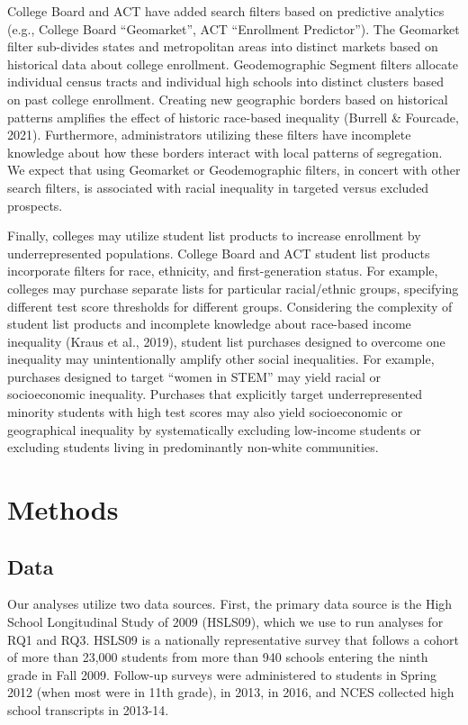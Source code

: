 \documentclass[
  12pt,
]{article}
\begin{document}
College Board and ACT have added search filters based on predictive analytics (e.g., College Board ``Geomarket'', ACT ``Enrollment Predictor''). The Geomarket filter sub-divides states and metropolitan areas into distinct markets based on historical data about college enrollment. Geodemographic Segment filters allocate individual census tracts and individual high schools into distinct clusters based on past college enrollment. Creating new geographic borders based on historical patterns amplifies the effect of historic race-based inequality (Burrell \& Fourcade, 2021). Furthermore, administrators utilizing these filters have incomplete knowledge about how these borders interact with local patterns of segregation. We expect that using Geomarket or Geodemographic filters, in concert with other search filters, is associated with racial inequality in targeted versus excluded prospects.

Finally, colleges may utilize student list products to increase enrollment by underrepresented populations. College Board and ACT student list products incorporate filters for race, ethnicity, and first-generation status. For example, colleges may purchase separate lists for particular racial/ethnic groups, specifying different test score thresholds for different groups. Considering the complexity of student list products and incomplete knowledge about race-based income inequality (Kraus et al., 2019), student list purchases designed to overcome one inequality may unintentionally amplify other social inequalities. For example, purchases designed to target ``women in STEM'' may yield racial or socioeconomic inequality. Purchases that explicitly target underrepresented minority students with high test scores may also yield socioeconomic or geographical inequality by systematically excluding low-income students or excluding students living in predominantly non-white communities.

\hypertarget{methods}{%
\section{Methods}\label{methods}}

\hypertarget{data}{%
\subsection{Data}\label{data}}

Our analyses utilize two data sources. First, the primary data source is the High School Longitudinal Study of 2009 (HSLS09), which we use to run analyses for RQ1 and RQ3. HSLS09 is a nationally representative survey that follows a cohort of more than 23,000 students from more than 940 schools entering the ninth grade in Fall 2009. Follow-up surveys were administered to students in Spring 2012 (when most were in 11th grade), in 2013, in 2016, and NCES collected high school transcripts in 2013-14.
\end{document}
